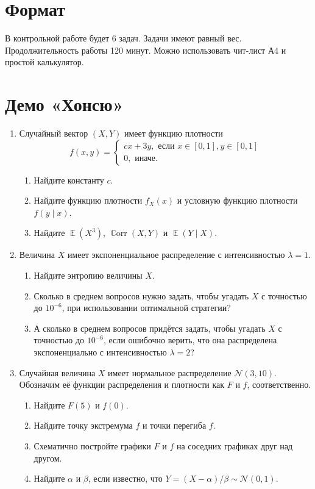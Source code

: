 \documentclass[12pt]{article}
\DeclareMathOperator{\Corr}{\mathbb{C}orr}
\DeclareMathOperator{\E}{\mathbb{E}}
\newcommand \cN{\mathcal{N}}
\begin{document}
\section*{Формат}

В контрольной работе будет 6 задач. 
Задачи имеют равный вес. 
Продолжительность работы 120 минут. 
Можно использовать чит-лист А4 и простой калькулятор.

\section*{Демо «Хонсю»}
\begin{enumerate}

    \item %
    Случайный вектор $(X, Y)$ имеет функцию плотности 
    \[
    f(x, y) = \begin{cases}
        cx + 3y, \text{ если } x\in[0,1], y \in [0, 1] \\
        0, \text{ иначе}.    
    \end{cases}
    \]
    \begin{enumerate}
        \item Найдите константу $c$.
        \item Найдите функцию плотности $f_X(x)$ и условную функцию плотности $f(y\mid x)$.
        \item Найдите $\E(X^3)$, $\Corr(X, Y)$ и $\E(Y \mid X)$.
    \end{enumerate}
    
    

    \item %
Величина $X$ имеет экспоненциальное распределение с интенсивностью $\lambda = 1$.
\begin{enumerate}
    \item Найдите энтропию величины $X$.
    \item Сколько в среднем вопросов нужно задать, чтобы угадать $X$ с точностью до $10^{-6}$, при использовании оптимальной стратегии?
    \item А сколько в среднем вопросов придётся задать, чтобы угадать $X$ с точностью до $10^{-6}$, если ошибочно верить, что она распределена экспоненциально с интенсивностью $\lambda = 2$?
\end{enumerate}


    \item %
    Случайная величина $X$ имеет нормальное распределение $\cN(3, 10)$. 
    Обозначим её функции распределения и плотности как $F$ и $f$, соответственно. 
    \begin{enumerate}
        \item Найдите $F(5)$ и $f(0)$.
        \item Найдите точку экстремума $f$ и точки перегиба $f$.
        \item Схематично постройте графики $F$ и $f$ на соседних графиках друг над другом. 
        \item Найдите $\alpha$ и $\beta$, если известно, что $Y = (X - \alpha)/\beta \sim \cN(0, 1)$.  
    \end{enumerate}
    

\end{enumerate}
\end{document}
